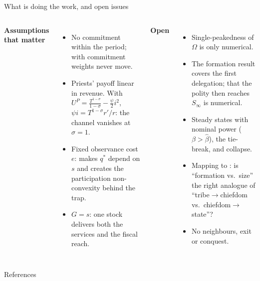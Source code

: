 \documentclass[11pt,aspectratio=169]{beamer}
\begin{document}
\begin{frame}{What is doing the work, and open issues}
\begin{columns}[T]
\textbf{Assumptions that matter}
\begin{itemize}
\item No commitment within the period; with commitment weights never move.
\item Priests' payoff linear in revenue. With $U^P=\frac{T^{1-\sigma}}{1-\sigma}-\frac\psi2 i^2$,
$\psi i=T^{1-\sigma}r'/r$: the channel vanishes at $\sigma=1$.
\item Fixed observance cost $e$: makes $q^*$ depend on $s$ and creates the participation
non-convexity behind the trap.
\item $G=s$: one stock delivers both the services and the fiscal reach.
\end{itemize}
\textbf{Open}
\begin{itemize}
\item Single-peakedness of $\Omega$ is only numerical.
\item The formation result covers the first delegation; that the polity then reaches $S_\infty$ is
numerical.
\item Steady states with nominal power ($\beta>\hat\beta$), the tie-break, and collapse.
\item Mapping to \citet{cook2026}: is ``formation vs.\ size'' the right analogue of
``tribe$\to$chiefdom vs.\ chiefdom$\to$state''?
\item No neighbours, exit or conquest.
\end{itemize}
\end{columns}
\end{frame}

\begin{frame}[allowframebreaks]{References}
\footnotesize


\end{frame}
\end{document}
